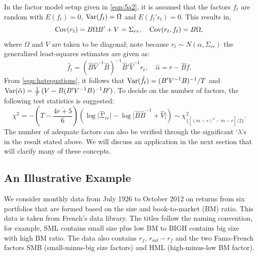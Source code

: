 	
In the factor model setup given in \eqref{eqn:5a2}, it is assumed that the factors $f_t$ are random with $E(f_t)= 0$, $\operatorname{Var}(f_t)= \Omega$ and $E(f_t' \epsilon_t)= 0$. This results in,
	\begin{equation} \label{eqn:covdouble}
	\cov(r_t)= B \Omega B' + V = \Sigma_{rr}, \quad \cov(r_t,f_t)= B \Omega,
	\end{equation}
where $\Omega$ and $V$ are taken to be diagonal; note because $r_t \sim N(\alpha,\Sigma_{rr})$ the generalized least-squares estimates are given as:
	\begin{equation} \label{eqn:hatequations}
	\hat{f}_t= (\hat{B} \hat{V}^{-1} \hat{B})^{-1} \hat{B}' \hat{V}^{-1} r_t, \quad \hat{\alpha}= \overline{r} - \hat{B} \overline{f}.
	\end{equation}	
From \eqref{eqn:hatequations}, it follows that $\operatorname{Var}(\hat{f}_t)= (B' V^{-1} B)^{-1}/T$ and $\operatorname{Var}(\hat{\alpha})= \frac{1}{T} \, (V - B(B' V^{-1}B)^{-1}B')$. To decide on the number of factors, the following test statistics is suggested:
	\begin{equation} \label{eqn:5chi}
	\chi^2= -\left(T- \overline{\frac{4r+5}{6}} \right) \left(\log \lvert\hat{\Sigma}_{rr}\rvert - \log \lvert\hat{B}\hat{B}^{-1} + \hat{V}\rvert \right)  \sim \chi^2_{\{[(m-r)^2-m-r]/2\}}.
	\end{equation}	
The number of adequate factors can also be verified through the significant `$\lambda$'s in the result stated above. We will discuss an application in the next section that will clarify many of these concepts. 
	


\subsection{An Illustrative Example}

We consider monthly data from July 1926 to October 2012 on returns from six portfolios that are formed based on the size and book-to-market (BM) ratio. This data is taken from French's data library. The titles follow the naming convention, for example, SML contains small size plus low BM to BIGH contains big size with high BM ratio. The data also contains $r_f$, $r_{mt} -  r_f$ and the two Fama-French factors SMB (small-minus-big size factors) and HML (high-minus-low BM factor).

